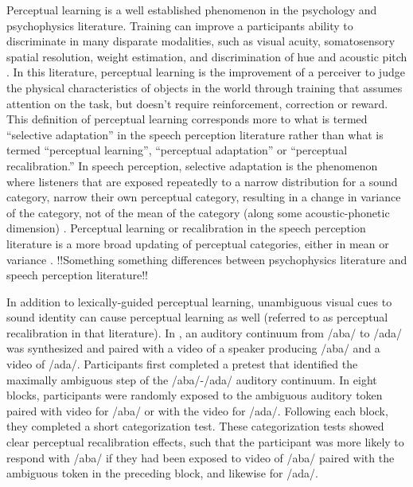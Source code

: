 Perceptual learning is a well established phenomenon in the psychology and psychophysics literature. 
Training can improve a participants ability to discriminate in many disparate modalities, such as visual acuity, somatosensory spatial resolution, weight estimation, and discrimination of hue and acoustic pitch \citep[for review]{Gibson1953}. 
 In this literature, perceptual learning is the improvement of a perceiver to judge the physical characteristics of objects in the world through training that assumes attention on the task, but doesn't require reinforcement, correction or reward.
This definition of perceptual learning corresponds more to what is termed ``selective adaptation'' in the speech perception literature rather than what is termed ``perceptual learning'', ``perceptual adaptation'' or ``perceptual recalibration.''  
In speech perception, selective adaptation is the phenomenon where listeners that are exposed repeatedly to a narrow distribution for a sound category, narrow their own perceptual category, resulting in a change in variance of the category, not of the mean of the category (along some acoustic-phonetic dimension) \citep{Eimas1973,Samuel1986,Vroomen2007}.
 Perceptual learning or recalibration in the speech perception literature is a more broad updating of perceptual categories, either in mean or variance \citep{Norris2003, Vroomen2007}.  
!!Something something differences between psychophysics literature and speech perception literature!!








In addition to lexically-guided perceptual learning, unambiguous visual cues to sound identity can cause perceptual learning as well (referred to as perceptual recalibration in that literature).
In \citet{Bertelson2003}, an auditory continuum from /aba/ to /ada/ was synthesized and paired with a video of a speaker producing /aba/ and a video of /ada/.  
Participants first completed a pretest that identified the maximally ambiguous step of the /aba/-/ada/ auditory continuum. 
 In eight blocks, participants were randomly exposed to the ambiguous auditory token paired with video for /aba/ or with the video for /ada/.  Following each block, they completed a short categorization test.  
These categorization tests showed clear perceptual recalibration effects, such that the participant was more likely to respond with /aba/ if they had been exposed to video of /aba/ paired with the ambiguous token in the preceding block, and likewise for /ada/.

